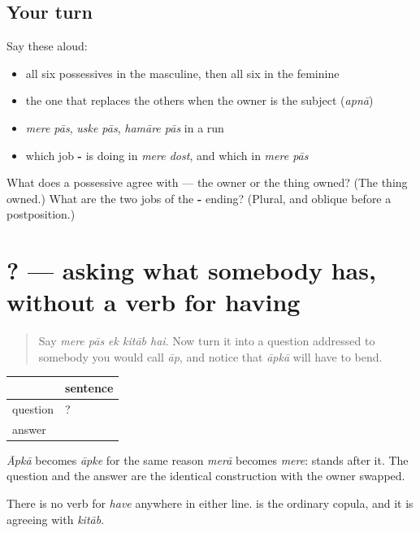 \subsection*{Your turn}
Say these aloud:

\begin{itemize}
\raggedright
  \item all six possessives in the masculine, then all six in the feminine
  \item the one that replaces the others when the owner is the subject (\emph{apnā})
  \item \emph{mere pās}, \emph{uske pās}, \emph{hamāre pās} in a run
  \item which job \textbf{-} is doing in \emph{mere dost}, and which in \emph{mere pās}
\end{itemize}

\begin{tcolorbox}[breakable,colback=teal!4,colframe=teal!35!black,title={Before you move on}]
What does a possessive agree with — the owner or the thing owned? (The thing owned.) What are the two jobs of the \textbf{-} ending? (Plural, and oblique before a postposition.)
\end{tcolorbox}
\section[\texorpdfstring{\hi{आपके} \hi{पास} \hi{क्या} \hi{है}? (āpke pās kyā hai?)}{आपके पास क्या है? (āpke pās kyā hai?)}]{   ? — asking what somebody has, without a verb for having}

\label{lesson:HI-C84-sintesis-mere-paas}



\begin{quote}
Say \emph{mere pās ek kitāb hai}. Now turn it into a question addressed to somebody you would call \emph{āp}, and notice that \emph{āpkā} will have to bend.
\end{quote}

\begin{grammarlens}[title={Grammar Lens: the question bends too}]
\noindent
\begin{tabularx}{\linewidth}{@{}>{\raggedright\arraybackslash}X>{\raggedright\arraybackslash}X@{}}
\toprule
\textbf{} & \textbf{sentence} \\
\midrule
question & \hi{आपके} \hi{पास} \hi{क्या} \hi{है}? \\
answer & \hi{मेरे} \hi{पास} \hi{एक} \hi{किताब} \hi{है।} \\
\bottomrule
\end{tabularx}

\emph{Āpkā} becomes \emph{āpke} for the same reason \emph{merā} becomes \emph{mere}: \textbf{} stands after it. The question and the answer are the identical construction with the owner swapped.

There is no verb for \emph{have} anywhere in either line. \textbf{} is the ordinary copula, and it is agreeing with \emph{kitāb}.
\end{grammarlens}

